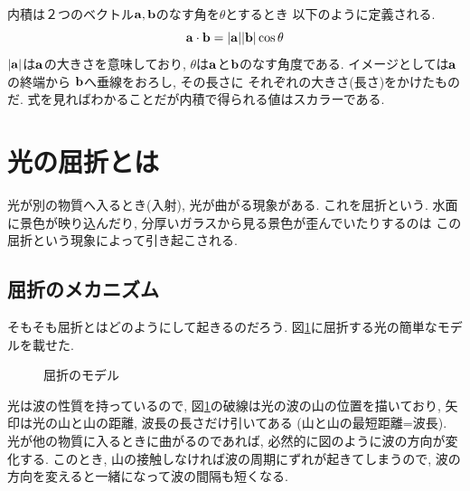 \documentclass[a4paper, xelatex, ja=standard]{bxjsarticle}
\begin{document}
内積は２つのベクトル$\vb{a, b}$のなす角を$\theta$とするとき
以下のように定義される.
\[
\vb{a}\cdot\vb{b}=|\vb{a}||\vb{b}|\cos{\theta}
\]
$|\vb{a}|$は$\vb{a}$の大きさを意味しており,
$\theta$は$\vb{a}$と$\vb{b}$のなす角度である.
イメージとしては$\vb{a}$の終端から
$\vb{b}$へ垂線をおろし, その長さに
それぞれの大きさ(長さ)をかけたものだ.
式を見ればわかることだが内積で得られる値はスカラーである.

\section{光の屈折とは}
光が別の物質へ入るとき(入射),
光が曲がる現象がある.
これを屈折という.
水面に景色が映り込んだり,
分厚いガラスから見る景色が歪んでいたりするのは
この屈折という現象によって引き起こされる.

\subsection{屈折のメカニズム}
そもそも屈折とはどのようにして起きるのだろう.
図\ref{fig:light-refraction}に屈折する光の簡単なモデルを載せた.
\begin{figure}[h]
\centering
\caption{屈折のモデル}
\label{fig:light-refraction}
\end{figure}
光は波の性質を持っているので,
図\ref{fig:light-refraction}の破線は光の波の山の位置を描いており,
矢印は光の山と山の距離, 波長の長さだけ引いてある
(山と山の最短距離=波長).
光が他の物質に入るときに曲がるのであれば,
必然的に図のように波の方向が変化する.
このとき, 山の接触しなければ波の周期にずれが起きてしまうので,
波の方向を変えると一緒になって波の間隔も短くなる.
\end{document}
